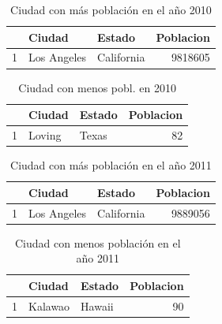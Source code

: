 \begin{table}[ht]
\centering
\begin{tabular}{rllr}
  \hline
 & Ciudad & Estado & Poblacion \\ 
  \hline
1 & Los Angeles & California & 9818605 \\ 
   \hline
\end{tabular}
\caption{Ciudad con más población en el año 2010} 
\end{table}


\begin{table}[ht]
\centering
\begin{tabular}{rllr}
  \hline
 & Ciudad & Estado & Poblacion \\ 
  \hline
1 & Loving & Texas &  82 \\ 
   \hline
\end{tabular}
\caption{Ciudad con menos pobl. en 2010} 
\end{table}


\begin{table}[ht]
\centering
\begin{tabular}{rllr}
  \hline
 & Ciudad & Estado & Poblacion \\ 
  \hline
1 & Los Angeles & California & 9889056 \\ 
   \hline
\end{tabular}
\caption{Ciudad con más población en el año 2011} 
\end{table}


\begin{table}[ht]
\centering
\begin{tabular}{rllr}
  \hline
 & Ciudad & Estado & Poblacion \\ 
  \hline
1 & Kalawao & Hawaii &  90 \\ 
   \hline
\end{tabular}
\caption{Ciudad con menos población en el año 2011} 
\end{table}


